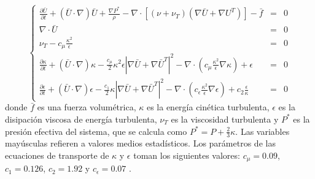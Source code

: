 \begin{equation}
\left\{ \begin{array}{rcl}
\displaystyle \frac{\partial \bar{U} }{\partial t} + ( \bar{U} \cdot \nabla) \bar{U} + \frac {\nabla P^*}{\rho} - 
\nabla \cdot \left[ \left( \nu + \nu_T \right) \left( \nabla \bar{U} + \nabla U^T \right) \right] -\bar{f} &=& 0 \\
\nabla \cdot \bar{U} &=& 0 \\
\displaystyle \nu_T -c_\mu \frac{\kappa^2}{\epsilon} &=& 0\\
\displaystyle \frac{\partial \kappa}{\partial t} + ( \bar{U} \cdot \nabla) \kappa - \frac{c_\mu} {2}{\kappa^2}{\epsilon} \left | \nabla \bar{U} + \nabla\bar{U}^T \right | ^2  
- \nabla \cdot \left( c_\mu \frac{\kappa^2}{\epsilon} \nabla \kappa \right) + \epsilon &=& 0 \\
\displaystyle \frac{\partial {\epsilon}}{\partial t} + ( \bar{U} \cdot \nabla) \epsilon - \frac{c_1} {2} \kappa \left | \nabla \bar{U} + \nabla \bar{U}^T \right | ^2
- \nabla \cdot \left( c_{\epsilon} \frac{\kappa^2}{\epsilon} \nabla \epsilon \right) + c_2 \frac{\epsilon}{\kappa} &=& 0
\label{eq-mani}
\end{array} \right.
\end{equation}
donde $\bar{f}$ es una fuerza volumétrica, 
$\kappa$ es la energía cinética turbulenta, $\epsilon$ es la disipación viscosa de energía turbulenta,
$\nu_T$ es la viscosidad turbulenta y $P^*$ es la presión efectiva del sistema, que se calcula como
$\displaystyle P^* = P + \frac {2}{3}\kappa$.
Las variables mayúsculas refieren a valores medios estadísticos.
Los parámetros de las ecuaciones de transporte de $\kappa$ y $\epsilon$ toman los siguientes valores:
$c_\mu=0.09$, $c_1=0.126$, $c_2=1.92$ y $c_\epsilon=0.07$ \cite{durbin}.

